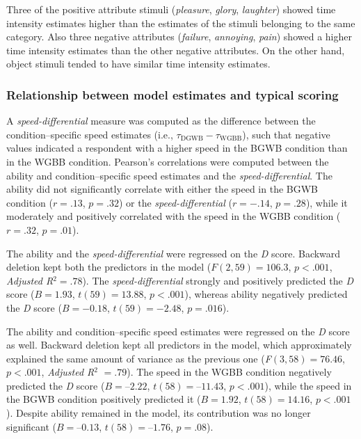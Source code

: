 \documentclass[12pt]{book}
\begin{document}
Three of the positive attribute stimuli (\emph{pleasure}, \emph{glory}, \emph{laughter}) showed time intensity estimates higher than the estimates of the stimuli belonging to the same category. Also three negative attributes (\emph{failure}, \emph{annoying}, \emph{pain}) showed a higher time intensity estimates than the other negative attributes. On the other hand, object stimuli tended to have similar time intensity estimates.

\subsubsection{Relationship between model estimates and typical scoring}
A \emph{speed-differential} measure was computed as the difference between the condition--specific speed estimates (i.e., $\tau_{\text{DGWB}} - \tau_{\text{WGBB}}$), such that negative values indicated a respondent with a higher speed in the BGWB condition than in the WGBB condition. 
Pearson's correlations were computed between the ability and condition--specific speed estimates and the \emph{speed-differential}.
The ability did not significantly correlate with either the speed in the BGWB condition ($r = .13$, $p = .32$) or the \emph{speed-differential} ($r = -.14$, $p = .28$), while it moderately and positively correlated with the speed in the WGBB condition ($r = .32$, $p = .01$).

The ability and the \emph{speed-differential} were regressed on the \emph{D} score.
Backward deletion kept both the predictors in the model ($F(2, 59) = 106.3$, $p < .001$, \emph{Adjusted R}$^2 = .78$). 
The \emph{speed-differential} strongly and positively predicted the \emph{D} score ($B = 1.93$, $t(59) = 13.88$, $p < .001$), whereas ability negatively predicted the \emph{D} score ($B = -0.18$, $t(59) = -2.48$, $p = .016$).

The ability and condition--specific speed estimates were regressed on the \emph{D} score as well.  
Backward deletion kept all predictors in the model, which approximately explained the same amount of variance as the previous one (\emph{F}$(3, 58) = 76.46$, $p < .001$, \emph{Adjusted R}$^2$ $= .79$). 
The speed in the WGBB condition negatively predicted the \emph{D} score ($B = –2.22$, $t(58) = –11.43$, $p < .001$), while the speed in the BGWB condition positively predicted it ($B = 1.92$, $t(58) = 14.16$, $p < .001$). Despite ability remained in the model, its contribution was no longer significant ($B = –0.13$, $t(58) =–1.76$, $p = .08$). 
\end{document}
